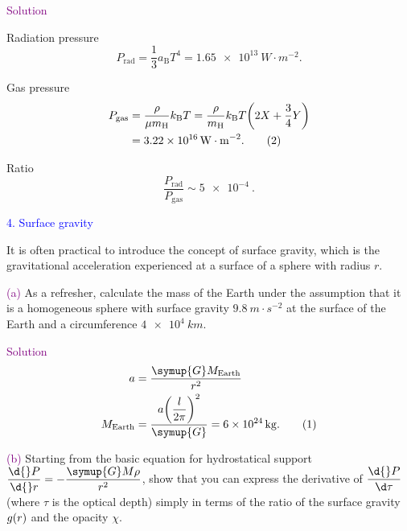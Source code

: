\documentclass[UTF8, 12pt, a4paper, oneside, twocolumn, fontset=none]{ctexart}
\begin{document}
\hspace*{\fill}

\noindent\textcolor{purple}{Solution}

Radiation pressure
\begin{equation}
P_{\mathrm{rad}}=\frac{1}{3}a_{\mathrm{B}}T^{4}=\qty{1.65e13}{W\cdot{}m^{-2}}.\tag{1}
\end{equation}

Gas pressure
\begin{align}
P_{\mathrm{gas}}&=\frac{\rho}{\mu{}m_{\ce{H}}}k_{\mathrm{B}}T=\frac{\rho}{m_{\ce{H}}}k_{\mathrm{B}}T\mleft(2X+\frac{3}{4}Y\mright)\notag\\
&=\qty{3.22e16}{W\cdot{}m^{-2}}.\tag{2}
\end{align}

Ratio
\begin{equation}
\frac{P_{\mathrm{rad}}}{P_{\mathrm{gas}}}\sim\qty{5e-4}{}.\tag{3}
\end{equation}

\hspace*{\fill}

\noindent\textcolor{blue}{4. Surface gravity}

\noindent It is often practical to introduce the concept of surface gravity, which is the gravitational acceleration experienced at a surface of a sphere with radius $r$.

\hspace*{\fill}

\noindent\textcolor{purple}{(a)} As a refresher, calculate the mass of the Earth under the assumption that it is a homogeneous sphere with surface gravity $\qty{9.8}{m\cdot{}s^{-2}}$ at the surface of the Earth and a circumference $\qty{4e4}{km}$.

\hspace*{\fill}

\noindent\textcolor{purple}{Solution}
\begin{align}
a&=\frac{\symup{G}M_{\mathrm{Earth}}}{r^{2}}\notag\\
M_{\mathrm{Earth}}&=\frac{a\mleft(\dfrac{l}{2\pi}\mright)^{2}}{\symup{G}}=\qty{6e24}{kg}.\tag{1}
\end{align}

\hspace*{\fill}

\noindent\textcolor{purple}{(b)} Starting from the basic equation for hydrostatical support $\dfrac{\d{}P}{\d{}r}=-\dfrac{\symup{G}M\rho}{r^{2}}$, show that you can express the derivative of $\dfrac{\d{}P}{\d\tau}$ (where $\tau$ is the optical depth) simply in terms of the ratio of the surface gravity $g\mleft(r\mright)$ and the opacity $\chi$.
\end{document}
